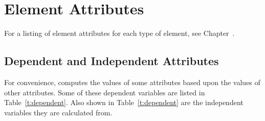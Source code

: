\chapter {Element Attributes}
\label{c:attrib}

For a listing of element attributes for each type of element, see Chapter~.

\section{Dependent and Independent Attributes} 
\label{s:depend} 

For convenience, \bmad computes the values of some attributes based upon the values of other
attributes. Some of these dependent variables are listed in Table~\ref{t:dependent}. Also shown in
Table~\ref{t:dependent} are the independent variables they are calculated from.

